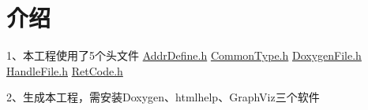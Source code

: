 \hypertarget{index_介绍}{}\section{介绍}\label{index_介绍}
1、本工程使用了5个头文件 \hyperlink{AddrDefine_8h}{Addr\-Define.\-h} \hyperlink{CommonType_8h}{Common\-Type.\-h} \hyperlink{DoxygenFile_8h}{Doxygen\-File.\-h} \hyperlink{HandleFile_8h}{Handle\-File.\-h} \hyperlink{RetCode_8h}{Ret\-Code.\-h} \par
 2、生成本工程，需安装\-Doxygen、htmlhelp、\-Graph\-Viz三个软件 
